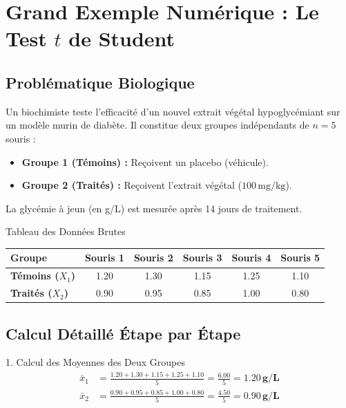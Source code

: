 \documentclass[11pt,a4paper]{article}
\begin{document}
\section{Grand Exemple Numérique : Le Test $t$ de Student}

\subsection{Problématique Biologique}
Un biochimiste teste l'efficacité d'un nouvel extrait végétal hypoglycémiant sur un modèle murin de diabète. Il constitue deux groupes indépendants de $n = 5$ souris :
\begin{itemize}[leftmargin=*, label=\faCheck]
  \item \textbf{Groupe 1 (Témoins) :} Reçoivent un placebo (véhicule).
  \item \textbf{Groupe 2 (Traités) :} Reçoivent l'extrait végétal ($100\,\text{mg/kg}$).
\end{itemize}
La glycémie à jeun (en g/L) est mesurée après 14 jours de traitement.

\begin{stepbox}{Tableau des Données Brutes}
\begin{center}
\begin{tabular}{lccccc}
\toprule
\textbf{Groupe} & \textbf{Souris 1} & \textbf{Souris 2} & \textbf{Souris 3} & \textbf{Souris 4} & \textbf{Souris 5} \\
\midrule
\textbf{Témoins ($X_1$)} & 1.20 & 1.30 & 1.15 & 1.25 & 1.10 \\
\textbf{Traités ($X_2$)} & 0.90 & 0.95 & 0.85 & 1.00 & 0.80 \\
\bottomrule
\end{tabular}
\end{center}
\end{stepbox}

\subsection{Calcul Détaillé Étape par Étape}

\begin{stepbox}{1. Calcul des Moyennes des Deux Groupes}
\begin{align*}
\bar{x}_1 &= \frac{1.20 + 1.30 + 1.15 + 1.25 + 1.10}{5} = \frac{6.00}{5} = \mathbf{1.20\,\text{g/L}} \\[2mm]
\bar{x}_2 &= \frac{0.90 + 0.95 + 0.85 + 1.00 + 0.80}{5} = \frac{4.50}{5} = \mathbf{0.90\,\text{g/L}}
\end{align*}
\end{stepbox}
\end{document}
